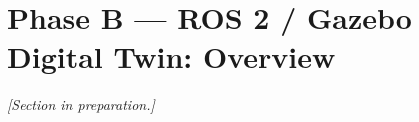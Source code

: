 \section{Phase B --- ROS 2 / Gazebo Digital Twin: Overview}
\label{sec:phaseB}

\emph{[Section in preparation.]}
